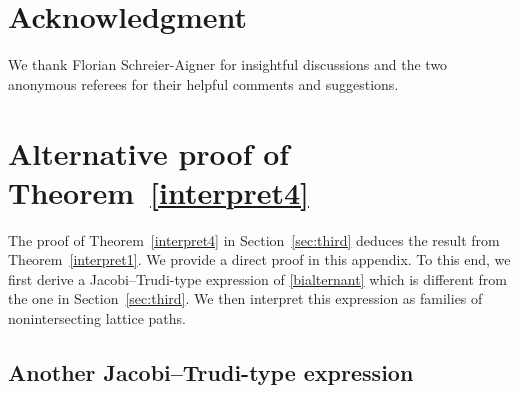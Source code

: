 \documentclass[12pt]{amsart}
\theoremstyle{definition}
\numberwithin{equation}{section}
\begin{document}
\section{Acknowledgment} 

We thank Florian Schreier-Aigner for insightful discussions and the two anonymous referees for their helpful comments and suggestions.

\appendix

\section{\texorpdfstring{Alternative proof of Theorem~\ref{interpret4}}{Alternative proof of Theorem~2.2}}\label{ap:computational_proof}

The proof of Theorem~\ref{interpret4} in Section~\ref{sec:third} deduces the 
result from Theorem~\ref{interpret1}. We provide a direct proof in this appendix. To this end, we first derive a Jacobi--Trudi-type expression of \eqref{bialternant} which is different from the one in Section~\ref{sec:third}. We then interpret this expression as families of nonintersecting lattice paths.

\subsection{Another Jacobi--Trudi-type expression} 
\end{document}
